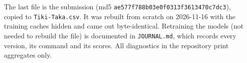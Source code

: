 \documentclass[10pt,a4paper]{article}
\newcommand{\code}[1]{\texttt{\small #1}}
\begin{document}
The last file is the submission (md5 \code{ae577f788b03e0f0313f3613470c7dc3}), copied to
\code{Tiki-Taka.csv}. It was rebuilt from scratch on 2026-11-16 with the training caches hidden and came
out byte-identical. Retraining the models (not needed to rebuild the file) is documented in
\code{JOURNAL.md}, which records every version, its command and its scores. All diagnostics in the
repository print aggregates only.
\end{document}
